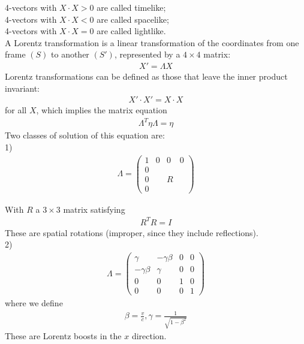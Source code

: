 \documentclass[a4paper]{article}
\begin{document}
4-vectors with $X\cdot X > 0$ are called timelike;\\
4-vectors with $X\cdot X < 0$ are called spacelike;\\
4-vectors with $X\cdot X = 0$ are called lightlike.\\

A Lorentz transformation is a linear transformation of the coordinates from one frame $\left(S\right)$ to another $\left(S'\right)$, represented by a $4\times 4$ matrix:
\begin{equation*}
\begin{aligned}
X' = \Lambda X
\end{aligned}
\end{equation*}
Lorentz transformations can be defined as those that leave the inner product invariant:
\begin{equation*}
\begin{aligned}
X' \cdot X' = X \cdot X
\end{aligned}
\end{equation*}
for all $X$, which implies the matrix equation
\begin{equation*}
\begin{aligned}
\Lambda^T \eta \Lambda = \eta
\end{aligned}
\end{equation*}
Two classes of solution of this equation are:\\
1)
\begin{equation*}
\begin{aligned}
\Lambda = \left(
\begin{matrix}
1&0&0&0\\
0& & &\\
0& &R&\\
0& & &
\end{matrix}
\right)
\end{aligned}
\end{equation*}

With $R$ a $3\times 3$ matrix satisfying
\begin{equation*}
\begin{aligned}
R^T R = I
\end{aligned}
\end{equation*}
These are spatial rotations (improper, since they include reflections).\\
2)
\begin{equation*}
\begin{aligned}
\Lambda = \left(
\begin{matrix}
\gamma & -\gamma\beta & 0&0\\
-\gamma\beta & \gamma & 0&0\\
0&0&1&0\\
0&0&0&1
\end{matrix}
\right)
\end{aligned}
\end{equation*}
where we define
\begin{equation*}
\begin{aligned}
\beta = \frac{v}{c}, \gamma = \frac{1}{\sqrt{1-\beta^2}}
\end{aligned}
\end{equation*}
These are Lorentz boosts in the $x$ direction.\\
\end{document}
